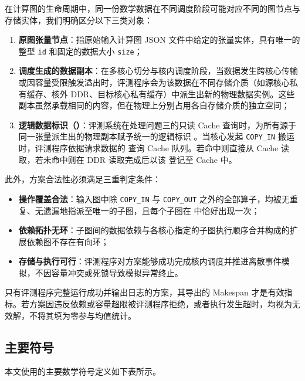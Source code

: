 \documentclass[anonymous,notoc]{gmcm2026}
\providecommand{\tightlist}{\setlength{\itemsep}{0pt}\setlength{\parskip}{0pt}}
\begin{document}
在计算图的生命周期中，同一份数学数据在不同调度阶段可能对应不同的图节点与存储实体，我们明确区分以下三类对象：

\begin{enumerate}
\def\labelenumi{\arabic{enumi}.}
\tightlist
\item
  \textbf{原图张量节点}：指原始输入计算图 JSON 文件中给定的张量实体，具有唯一的整型 \texttt{id} 和固定的数据大小 \texttt{size}；
\item
  \textbf{调度生成的数据副本}：在多核心切分与核内调度阶段，当数据发生跨核心传输或因容量受限触发溢出时，评测程序会为该数据在不同存储介质（如源核心私有缓存、核外 DDR、目标核心私有缓存）中派生出新的物理数据实例。这些副本虽然承载相同的内容，但在物理上分别占用各自存储介质的独立空间；
\item
  \textbf{逻辑数据标识（\texttt{}）}：评测系统在处理问题三的只读 Cache 查询时，为所有源于同一张量派生出的物理副本赋予统一的逻辑标识 \texttt{}。当核心发起 \texttt{COPY\_IN} 搬运时，评测程序依据请求数据的 \texttt{} 查询 Cache 队列。若命中则直接从 Cache 读取，若未命中则在 DDR 读取完成后以该 \texttt{} 登记至 Cache 中。
\end{enumerate}

此外，方案合法性必须满足三重判定条件：

\begin{itemize}
\tightlist
\item
  \textbf{操作覆盖合法}：输入图中除 \texttt{COPY\_IN} 与 \texttt{COPY\_OUT} 之外的全部算子，均被无重复、无遗漏地指派至唯一的子图，且每个子图在 \texttt{} 中恰好出现一次；
\item
  \textbf{依赖拓扑无环}：子图间的数据依赖与各核心指定的子图执行顺序合并构成的扩展依赖图不存在有向环；
\item
  \textbf{存储与执行可行}：评测程序对方案能够成功完成核内调度并推进离散事件模拟，不因容量冲突或死锁导致模拟异常终止。
\end{itemize}

只有评测程序完整运行成功并输出日志的方案，其导出的 Makespan 才是有效指标。若方案因违反依赖或容量超限被评测程序拒绝，或者执行发生超时，均视为无效解，不将其填为零参与均值统计。

\subsection{主要符号}

本文使用的主要数学符号定义如下表所示。
\end{document}
